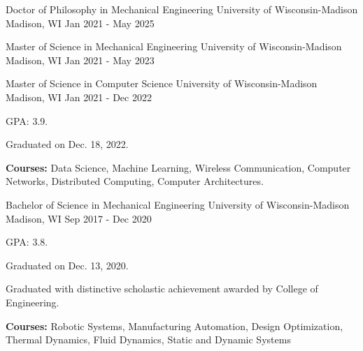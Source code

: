 

\begin{cventries}

  \cventry
    {Doctor of Philosophy in Mechanical Engineering} %
    {University of Wisconsin-Madison} %
    {Madison, WI} %
    {Jan 2021 - May 2025} %
    {}
    
  \cventry
    {Master of Science in Mechanical Engineering} %
    {University of Wisconsin-Madison} %
    {Madison, WI} %
    {Jan 2021 - May 2023} %
    {}
    
  \cventry
	{Master of Science in Computer Science} %
	{University of Wisconsin-Madison} %
	{Madison, WI} %
	{Jan 2021 - Dec 2022} %
	{
	  \begin{cvitems} %
		\item {GPA: 3.9.}
		\item {Graduated on Dec. 18, 2022.}
		\item {\textbf{Courses:} Data Science, Machine Learning, Wireless Communication, Computer Networks, Distributed Computing, Computer Architectures.}
	  \end{cvitems}
	}

  \cventry
	{Bachelor of Science in Mechanical Engineering} %
	{University of Wisconsin-Madison} %
	{Madison, WI} %
	{Sep 2017 - Dec 2020} %
	{
	  \begin{cvitems} %
		\item {GPA: 3.8.}
		\item {Graduated on Dec. 13, 2020.}
		\item{Graduated with distinctive scholastic achievement awarded by College of Engineering.}
	    \item {\textbf{Courses:} Robotic Systems, Manufacturing Automation, Design Optimization, Thermal Dynamics, Fluid Dynamics, Static and Dynamic Systems}
	  \end{cvitems}
	}


\end{cventries}
